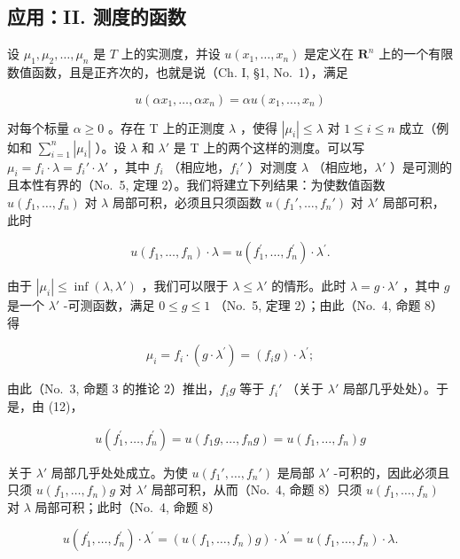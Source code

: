\subsection{应用：II. 测度的函数}

设 \(\mu_1, \mu_2, \ldots, \mu_n\) 是 \(T\) 上的实测度，并设 \(u(x_1, \ldots, x_n)\) 是定义在 \(\mathbf{R}^n\) 上的一个有限数值函数，且是正齐次的，也就是说（Ch. I, §1, No.~1），满足

\[
u (\alpha x _ {1}, \ldots , \alpha x _ {n}) = \alpha u (x _ {1}, \ldots , x _ {n})\tag{12}
\]

对每个标量 \(\alpha \geqslant 0\) 。存在 T 上的正测度 \(\lambda\) ，使得 \(|\mu_i| \leqslant \lambda\) 对 \(1 \leqslant i \leqslant n\) 成立（例如和 \(\sum_{i=1}^{n} |\mu_i|\) ）。设 \(\lambda\) 和 \(\lambda'\) 是 T 上的两个这样的测度。可以写 \(\mu_i = f_i \cdot \lambda = f_i' \cdot \lambda'\) ，其中 \(f_i\) （相应地，\(f_i'\) ）对测度 \(\lambda\) （相应地，\(\lambda'\) ）是可测的且本性有界的（No.~5, 定理 2）。我们将建立下列结果：为使数值函数 \(u(f_1, \ldots, f_n)\) 对 \(\lambda\) 局部可积，必须且只须函数 \(u(f_1', \ldots, f_n')\) 对 \(\lambda'\) 局部可积，此时

\[
u (f _ {1}, \dots , f _ {n}) \cdot \lambda = u (f _ {1} ^ {\prime}, \dots , f _ {n} ^ {\prime}) \cdot \lambda^ {\prime}.
\]

由于 \(|\mu_i| \leqslant \inf(\lambda, \lambda')\) ，我们可以限于 \(\lambda \leqslant \lambda'\) 的情形。此时 \(\lambda = g \cdot \lambda'\) ，其中 \(g\) 是一个 \(\lambda'\) -可测函数，满足 \(0 \leqslant g \leqslant 1\) （No.~5, 定理 2）；由此（No.~4, 命题 8）得

\[
\mu_ {i} = f _ {i} \cdot (g \cdot \lambda^ {\prime}) = (f _ {i} g) \cdot \lambda^ {\prime};
\]

由此（No.~3, 命题 3 的推论 2）推出，\(f_{i}g\) 等于 \(f_{i}'\) （关于 \(\lambda'\) 局部几乎处处）。于是，由 (12)，

\[
u (f _ {1} ^ {\prime}, \dots , f _ {n} ^ {\prime}) = u (f _ {1} g, \dots , f _ {n} g) = u (f _ {1}, \dots , f _ {n}) g
\]

关于 \(\lambda'\) 局部几乎处处成立。为使 \(u(f_1', \ldots, f_n')\) 是局部 \(\lambda'\) -可积的，因此必须且只须 \(u(f_1, \ldots, f_n)g\) 对 \(\lambda'\) 局部可积，从而（No.~4, 命题 8）只须 \(u(f_1, \ldots, f_n)\) 对 \(\lambda\) 局部可积；此时（No.~4, 命题 8）

\[
u \left(f _ {1} ^ {\prime}, \dots , f _ {n} ^ {\prime}\right) \cdot \lambda^ {\prime} = \left(u \left(f _ {1}, \dots , f _ {n}\right) g\right) \cdot \lambda^ {\prime} = u \left(f _ {1}, \dots , f _ {n}\right) \cdot \lambda .
\]

